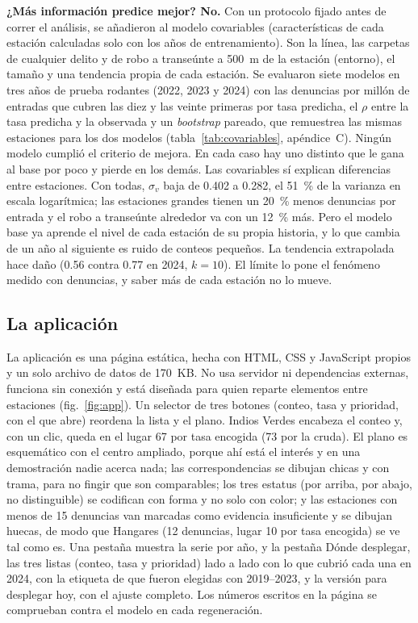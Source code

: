 \documentclass[conference]{IEEEtran}
\newcommand{\pme}{por millón de entradas}
\begin{document}
\textbf{¿Más información predice mejor? No.} Con un protocolo fijado antes de correr el análisis, se añadieron al modelo covariables (características de cada estación calculadas solo con los años de entrenamiento). Son la línea, las carpetas de cualquier delito y de robo a transeúnte a 500~m de la estación (entorno), el tamaño y una tendencia propia de cada estación. Se evaluaron siete modelos en tres años de prueba rodantes (2022, 2023 y 2024) con las denuncias \pme{} que cubren las diez y las veinte primeras por tasa predicha, el $\rho$ entre la tasa predicha y la observada y un \emph{bootstrap} pareado, que remuestrea las mismas estaciones para los dos modelos (tabla~\ref{tab:covariables}, apéndice~C). Ningún modelo cumplió el criterio de mejora. En cada caso hay uno distinto que le gana al base por poco y pierde en los demás. Las covariables sí explican diferencias entre estaciones. Con todas, $\sigma_v$ baja de 0.402 a 0.282, el 51~\% de la varianza en escala logarítmica; las estaciones grandes tienen un 20~\% menos denuncias por entrada y el robo a transeúnte alrededor va con un 12~\% más. Pero el modelo base ya aprende el nivel de cada estación de su propia historia, y lo que cambia de un año al siguiente es ruido de conteos pequeños. La tendencia extrapolada hace daño (0.56 contra 0.77 en 2024, $k = 10$). El límite lo pone el fenómeno medido con denuncias, y saber más de cada estación no lo mueve.


\subsection{La aplicación}

La aplicación \cite{app_metro} es una página estática, hecha con HTML, CSS y JavaScript propios y un solo archivo de datos de 170~KB. No usa servidor ni dependencias externas, funciona sin conexión y está diseñada para quien reparte elementos entre estaciones (fig.~\ref{fig:app}). Un selector de tres botones (conteo, tasa y prioridad, con el que abre) reordena la lista y el plano. Indios Verdes encabeza el conteo y, con un clic, queda en el lugar 67 por tasa encogida (73 por la cruda). El plano es esquemático con el centro ampliado, porque ahí está el interés y en una demostración nadie acerca nada; las correspondencias se dibujan chicas y con trama, para no fingir que son comparables; los tres estatus (por arriba, por abajo, no distinguible) se codifican con forma y no solo con color; y las estaciones con menos de 15 denuncias van marcadas como evidencia insuficiente y se dibujan huecas, de modo que Hangares (12 denuncias, lugar 10 por tasa encogida) se ve tal como es. Una pestaña muestra la serie por año, y la pestaña Dónde desplegar, las tres listas (conteo, tasa y prioridad) lado a lado con lo que cubrió cada una en 2024, con la etiqueta de que fueron elegidas con 2019--2023, y la versión para desplegar hoy, con el ajuste completo. Los números escritos en la página se comprueban contra el modelo en cada regeneración.
\end{document}
